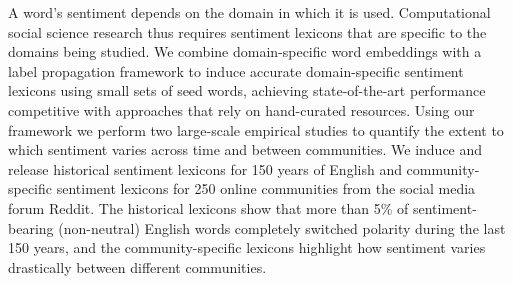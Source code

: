 A word's sentiment depends on the domain in which it is used. Computational social science research thus requires sentiment lexicons that are specific to the domains being studied. We combine domain-specific word embeddings with a label propagation framework to induce accurate domain-specific sentiment lexicons using small sets of seed words, achieving state-of-the-art performance competitive with approaches that rely on hand-curated resources. Using our framework we perform two large-scale empirical studies to quantify the extent to which sentiment varies across time and between communities. We induce and release historical sentiment lexicons for 150 years of English and community-specific sentiment lexicons for 250 online communities from the social media forum Reddit. The historical lexicons show that more than 5\% of sentiment-bearing (non-neutral) English words completely switched polarity during the last 150 years, and the community-specific lexicons highlight how sentiment varies drastically between different communities.
